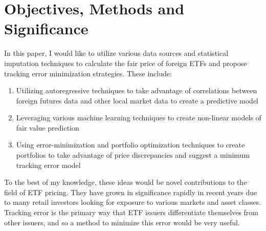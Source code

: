 \documentclass[12pt]{article}
\begin{document}
\section{Objectives, Methods and Significance}
In this paper, I would like to utilize various data sources and statistical imputation techniques to calculate the fair price of foreign ETFs and propose tracking error minimization strategies. These include:
\begin{enumerate}
	\item Utilizing autoregressive techniques to take advantage of correlations between foreign futures data and other local market data to create a predictive model
	\item Leveraging various machine learning techniques to create non-linear models of fair value prediction
	\item Using error-minimization and portfolio optimization techniques to create portfolios to take advantage of price discrepancies and suggest a minimum tracking error model
\end{enumerate}

To the best of my knowledge, these ideas would be novel contributions to the field of ETF pricing. They have grown in significance rapidly in recent years due to many retail investors looking for exposure to various markets and asset classes. Tracking error is the primary way that ETF issuers differentiate themselves from other issuers, and so a method to minimize this error would be very useful.

\newpage

  


\end{document}
